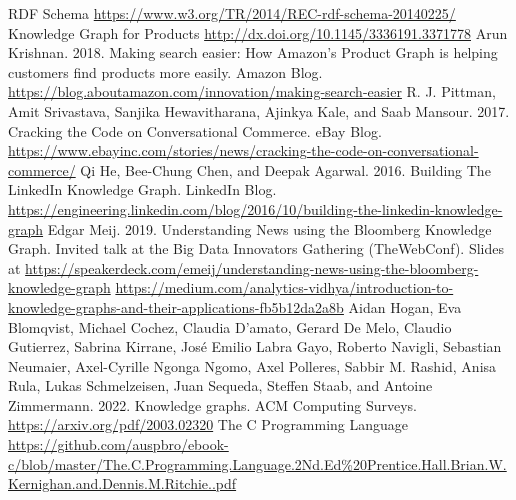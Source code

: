 \documentclass[conference]{IEEEtran}
\begin{document}
\begin{thebibliography}{00}
 RDF Schema \url{https://www.w3.org/TR/2014/REC-rdf-schema-20140225/}
 Knowledge Graph for Products \url{http://dx.doi.org/10.1145/3336191.3371778}
 Arun Krishnan. 2018. Making search easier: How Amazon’s Product Graph is helping customers find products more easily. Amazon Blog. \url{https://blog.aboutamazon.com/innovation/making-search-easier}
 R. J. Pittman, Amit Srivastava, Sanjika Hewavitharana, Ajinkya Kale, and Saab Mansour. 2017. Cracking the Code on Conversational Commerce. eBay Blog. \url{https://www.ebayinc.com/stories/news/cracking-the-code-on-conversational-commerce/}
 Qi He, Bee-Chung Chen, and Deepak Agarwal. 2016. Building The LinkedIn Knowledge Graph. LinkedIn Blog. \url{https://engineering.linkedin.com/blog/2016/10/building-the-linkedin-knowledge-graph}
 Edgar Meij. 2019. Understanding News using the Bloomberg Knowledge Graph. Invited talk at the Big Data Innovators Gathering (TheWebConf). Slides at \url{https://speakerdeck.com/emeij/understanding-news-using-the-bloomberg-knowledge-graph}
 \url{https://medium.com/analytics-vidhya/introduction-to-knowledge-graphs-and-their-applications-fb5b12da2a8b}
 Aidan Hogan, Eva Blomqvist, Michael Cochez, Claudia D’amato, Gerard De Melo, Claudio Gutierrez, Sabrina Kirrane, José Emilio Labra Gayo, Roberto Navigli, Sebastian Neumaier, Axel-Cyrille Ngonga Ngomo, Axel Polleres, Sabbir M. Rashid, Anisa Rula, Lukas Schmelzeisen, Juan Sequeda, Steffen Staab, and Antoine Zimmermann. 2022. Knowledge graphs. ACM Computing Surveys. \url{https://arxiv.org/pdf/2003.02320}
 The C Programming Language \url{https://github.com/auspbro/ebook-c/blob/master/The.C.Programming.Language.2Nd.Ed%20Prentice.Hall.Brian.W.Kernighan.and.Dennis.M.Ritchie..pdf}
\end{thebibliography}
\end{document}
